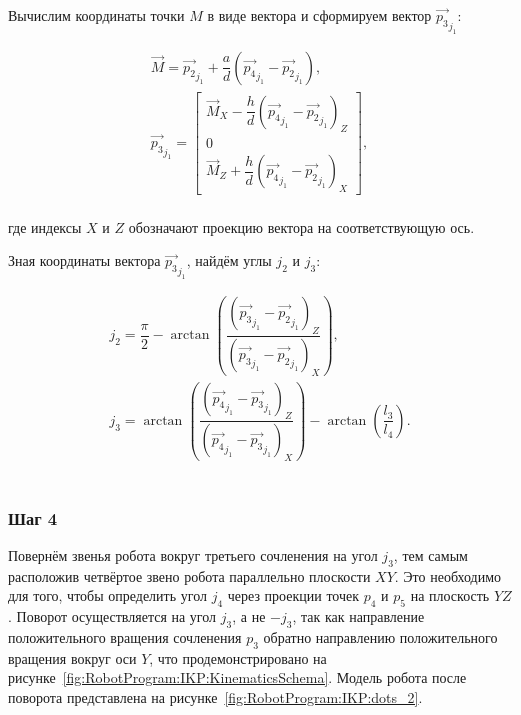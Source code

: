 Вычислим координаты точки $M$ в виде вектора и сформируем вектор $\overrightarrow{p_3}_{j_1}$:

\begin{gather*}
    \overrightarrow{M} = \overrightarrow{p_2}_{j_1} + \dfrac{a}{d} \left( \overrightarrow{p_4}_{j_1} - \overrightarrow{p_2}_{j_1} \right), \\
    \overrightarrow{p_3}_{j_1} =
    \begin{bmatrix}
        \overrightarrow{M}_X - \dfrac{h}{d} \left( \overrightarrow{p_4}_{j_1} - \overrightarrow{p_2}_{j_1} \right)_Z \\
        0                                                                                                            \\
        \overrightarrow{M}_Z + \dfrac{h}{d} \left( \overrightarrow{p_4}_{j_1} - \overrightarrow{p_2}_{j_1} \right)_X
    \end{bmatrix},
\end{gather*} \\
где индексы $X$ и $Z$ обозначают проекцию вектора на соответствующую ось.

Зная координаты вектора $\overrightarrow{p_3}_{j_1}$, найдём углы $j_2$ и $j_3$:

\begin{gather*}
    j_2 = \dfrac{\pi}{2} - \arctan \left( \dfrac
    {\left( \overrightarrow{p_3}_{j_1} - \overrightarrow{p_2}_{j_1} \right)_Z}
    {\left( \overrightarrow{p_3}_{j_1} - \overrightarrow{p_2}_{j_1} \right)_X} \right), \\
    j_3 = \arctan \left( \dfrac
    {\left( \overrightarrow{p_4}_{j_1} - \overrightarrow{p_3}_{j_1} \right)_Z}
    {\left( \overrightarrow{p_4}_{j_1} - \overrightarrow{p_3}_{j_1} \right)_X} \right) - \arctan\left( \dfrac{l_3}{l_4} \right).
\end{gather*} \\

\subsubsection*{Шаг 4}
Повернём звенья робота вокруг третьего сочленения на угол $j_3$, тем самым расположив четвёртое звено робота параллельно плоскости $XY$.
Это необходимо для того, чтобы определить угол $j_4$ через проекции точек $p_4$ и $p_5$ на плоскость $YZ$.
Поворот осуществляется на угол $j_3$, а не $-j_3$, так как направление положительного вращения сочленения $p_3$ обратно направлению положительного вращения вокруг оси $Y$, что продемонстрировано на рисунке~\ref{fig:RobotProgram:IKP:KinematicsSchema}.
Модель робота после поворота представлена на рисунке~\ref{fig:RobotProgram:IKP:dots_2}.

